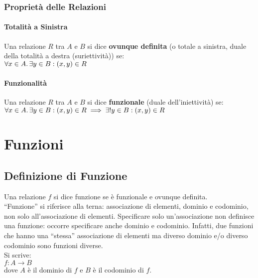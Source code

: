 \documentclass[a4paper, twoside, italian, 11pt]{book}
\begin{document}
\subsection{Proprietà delle Relazioni}


\subsubsection{Totalità a Sinistra}

Una relazione $R$ tra $A$ e $B$ si dice \textbf{ovunque definita} (o totale a sinistra, duale della totalità a destra (suriettività)) se: \\

$\forall x \in A \ldotp \exists y \in B : (x, y) \in R$


\subsubsection{Funzionalità}

Una relazione $R$ tra $A$ e $B$ si dice \textbf{funzionale} (duale dell'iniettività) se: \\

$\forall x \in A \ldotp \exists y \in B : (x, y) \in R \implies \exists! y \in B : (x, y) \in R$



\chapter{Funzioni}



\section{Definizione di Funzione}

Una relazione $f$ si dice funzione se è funzionale e ovunque definita. \\

\noindent
``Funzione'' si riferisce alla terna: associazione di elementi, dominio e codominio, non solo all'associazione di elementi. Specificare solo un'associazione non definisce una funzione: occorre specificare anche dominio e codominio. Infatti, due funzioni che hanno una ``stessa'' associazione di elementi ma diverso dominio e/o diverso codominio sono funzioni diverse. \\

\noindent
Si scrive: \\
$f : A \rightarrow B$ \\
dove $A$ è il dominio di $f$ e $B$ è il codominio di $f$.
\end{document}
